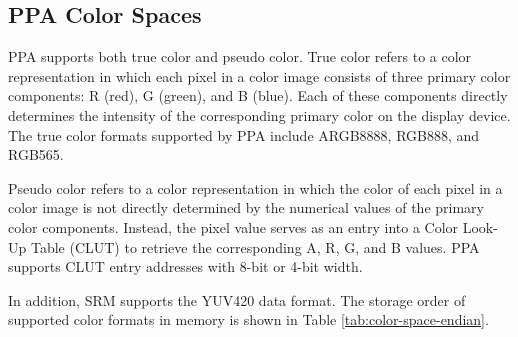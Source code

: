 \documentclass[main\_\_EN.tex]{subfiles}
\begin{document}
\subsection{PPA Color Spaces}

PPA supports both true color and pseudo color. True color refers to a color representation in which each pixel in a color image consists of three primary color components: R (red), G (green), and B (blue). Each of these components directly determines the intensity of the corresponding primary color on the display device. The true color formats supported by PPA include ARGB8888, RGB888, and RGB565.

Pseudo color refers to a color representation in which the color of each pixel in a color image is not directly determined by the numerical values of the primary color components. Instead, the pixel value serves as an entry into a Color Look-Up Table (CLUT) to retrieve the corresponding A, R, G, and B values. PPA supports CLUT entry addresses with 8-bit or 4-bit width.

In addition, SRM supports the YUV420 data format. The storage order of supported color formats in memory is shown in Table \ref{tab:color-space-endian}.
\end{document}
